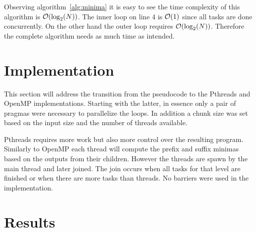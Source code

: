 Observing algorithm~\ref{alg:minima} it is easy to see the time complexity of this algorithm is $\mathcal{O}(\log_2(N))$. The inner loop on line 4 is  $\mathcal{O}(1)$ since all tasks are done concurrently. On the other hand the outer loop requires $\mathcal{O}(\log_2(N))$. Therefore the complete algorithm needs as much time as intended.

\section{Implementation}

This section will address the transition from the pseudocode to the Pthreads and OpenMP implementations. Starting with the latter, in essence only a pair of pragmas were necessary to parallelize the loops. In addition a chunk size was set based on the input size and the number of threads available.

Pthreads requires more work but also more control over the resulting program. Similarly to OpenMP each thread will compute the prefix and suffix minimas based on the outputs from their children. However the threads are spawn by the main thread and later joined. The join occurs when all tasks for that level are finished or when there are more tasks than threads. No barriers were used in the implementation.

\section{Results}
\label{sec:results}


